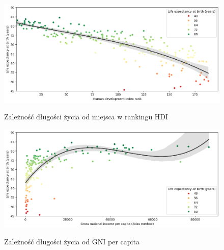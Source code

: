 \documentclass{article}
\begin{document}
\begin{enumerate}
    \begin{figure}[H]
        \begin{minipage}[t]{0.48\textwidth}
            \label{fig:hdi_rank}
            \includegraphics[width=\textwidth]{graphs/hdi_rank.png}
            \caption{Zależność długości życia od miejsca w rankingu HDI}
            \centering
        \end{minipage}
        \hfill
        \begin{minipage}[t]{0.48\textwidth}
            \label{fig:gni}
            \includegraphics[width=\textwidth]{graphs/gni.png}
            \caption{Zależność długości życia od GNI per capita}
            \centering
        \end{minipage}
    \end{figure}


\end{enumerate}
\end{document}
